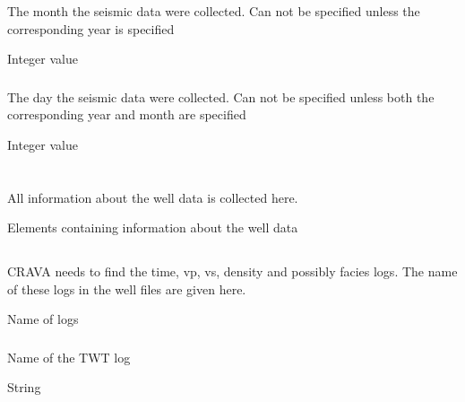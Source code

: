  \subsubsection{}
 \slist
   \item \Description The month the seismic data were collected. Can not be specified unless the corresponding year is specified
   \item \Argument Integer value
   \item \Default
 \elist

  \subsubsection{}
 \slist
   \item \Description The day the seismic data were collected. Can not be specified unless both the corresponding year and month are specified
   \item \Argument Integer value
   \item \Default
 \elist


\section{} 
 \slist
   \item \Description All information about the well data is collected here.
   \item \Argument Elements containing information about the well data
   \item \Default
 \elist

\subsection{} 
 \slist
   \item \Description CRAVA needs to find the time, vp, vs, density and possibly facies logs. The name of these logs in the well files are given here.
   \item \Argument Name of logs
   \item \Default
 \elist

\subsubsection{} 
 \slist
   \item \Description Name of the TWT log
   \item \Argument String
   \item \Default %
 \elist

